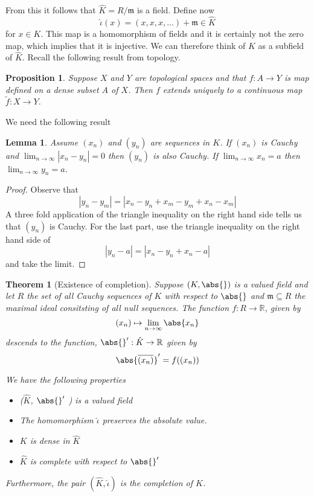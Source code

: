 \documentclass{article}
\newtheorem{theorem}{Theorem}[section]
\newtheorem{proposition}{Proposition}[section]
\newtheorem{lemma}{Lemma}[section]
\newcommand{\mfrak}[1]{\mathfrak{#1}}
\newcommand{\mbb}[1]{\mathbb{#1}}
\numberwithin{equation}{section}
\begin{document}
From this it follows that $\hat K = R / \mfrak m$ is a field. Define now $$\hat \iota (x) = (x,x,x,...) + \mfrak m \in \hat K$$ for $x \in K$. This map is a homomorphism of fields and it is certainly not the zero map, which implies that it is injective. We can therefore think of $K$ as a subfield of $\hat K$. Recall the following result from topology.
\begin{proposition}\label{prop: Function on a dense set}
    Suppose $X$ and $Y$ are topological spaces and that $f : A \to Y$ is map defined on a dense subset $A$ of $X$. Then $f$ extends uniquely to a continuous map $\tilde f : X \to Y$.
\end{proposition}
We need the following result

\begin{lemma}\label{lem: Helper result for existence of completion}
    Assume $(x_n)$ and $(y_n)$ are sequences in $K$. If $(x_n)$ is Cauchy and $\lim_{n \to \infty} |x_n - y_n| = 0$ then $(y_n)$ is also Cauchy. If $\lim_{n \to \infty} x_n = a$ then $\lim_{n \to \infty} y_n = a$.
\end{lemma}

\begin{proof}
    Observe that
    $$
        |y_n - y_m| = |x_n - y_n + x_m - y_m + x_n - x_m|
        $$
    A three fold application of the triangle inequality on the right hand side tells us that $(y_n)$ is Cauchy. For the last part, use the triangle inequality on the right hand side of
    $$|y_n - a| = |x_n - y_n + x_n - a|$$
    and take the limit.
\end{proof}

\begin{theorem}[Existence of completion]\label{thm: Existence of completion}
    Suppose $(K, \abs{})$ is a valued field and let $R$ the set of all Cauchy sequences of $K$ with respect to $\abs{}$ and $\mfrak m \subseteq R$ the maximal ideal consitsting of all null sequences. The function $f : R \to \mbb R$, given by
    $$(x_n) \mapsto \lim_{n \to \infty} \abs{x_n}$$
    descends to the function, $\abs{}' : \hat K \to \mbb R$ given by
    $$\abs{\overline {(x_n)}}' = f( (x_n) )$$

    We have the following properties
    \begin{itemize}
        \item ($\hat K$, $\abs{}'$ ) is a valued field
        \item The homomorphism $\hat \iota$ preserves the absolute value.
        \item $K$ is dense in $\hat K$
        \item $\hat K$ is complete with respect to $\abs{}'$
    \end{itemize}

    Furthermore, the pair $(\hat K, \hat \iota)$ is the completion of $K$.

\end{theorem}
\end{document}
